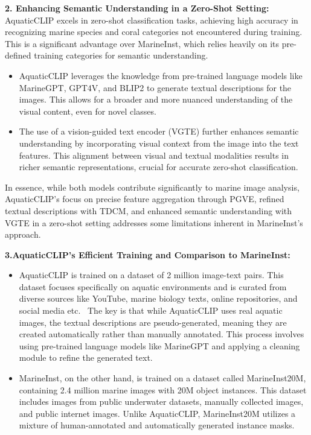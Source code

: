\noindent \textbf{2. Enhancing Semantic Understanding in a Zero-Shot Setting:} AquaticCLIP excels in zero-shot classification tasks, achieving high accuracy in recognizing marine species and coral categories not encountered during training. 
This is a significant advantage over MarineInst, which relies heavily on its pre-defined training categories for semantic understanding.

\begin{itemize}
    \item AquaticCLIP leverages the knowledge from pre-trained language models like MarineGPT, GPT4V, and BLIP2 to generate textual descriptions for the images. 
    This allows for a broader and more nuanced understanding of the visual content, even for novel classes.
     \item The use of a vision-guided text encoder (VGTE) further enhances semantic understanding by incorporating visual context from the image into the text features. 
     This alignment between visual and textual modalities results in richer semantic representations, crucial for accurate zero-shot classification.
\end{itemize}
	

In essence, while both models contribute significantly to marine image analysis, AquaticCLIP's focus on precise feature aggregation through PGVE, refined textual descriptions with TDCM, and enhanced semantic understanding with VGTE in a zero-shot setting addresses some limitations inherent in MarineInst's approach.

\noindent \textbf{3.AquaticCLIP's Efficient Training and Comparison to MarineInst:}
\begin{itemize}
    \item AquaticCLIP is trained on a dataset of 2 million image-text pairs. 
    This dataset focuses specifically on aquatic environments and is curated from diverse sources like YouTube, marine biology texts, online repositories, and social media etc. \
    The key is that while AquaticCLIP uses real aquatic images, the textual descriptions are pseudo-generated, meaning they are created automatically rather than manually annotated. 
    This process involves using pre-trained language models like MarineGPT and applying a cleaning module to refine the generated text.
\item MarineInst, on the other hand, is trained on a dataset called MarineInst20M, containing 2.4 million marine images with 20M object instances. 
This dataset includes images from public underwater datasets, manually collected images, and public internet images. Unlike AquaticCLIP, MarineInst20M utilizes a mixture of human-annotated and automatically generated instance masks.
\end{itemize}

